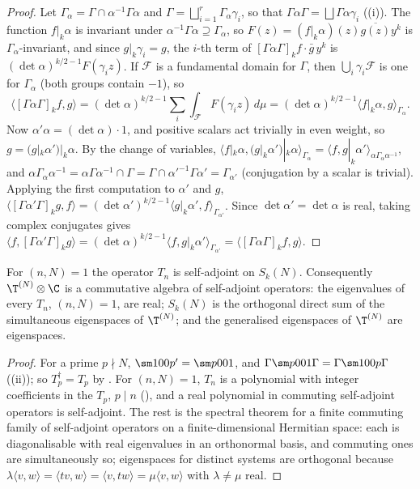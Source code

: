 \begin{proof}
Let $\Gamma_\alpha=\Gamma\cap\alpha^{-1}\Gamma\alpha$ and $\Gamma=\bigsqcup_{i=1}^r\Gamma_\alpha\gamma_i$, so that $\Gamma\alpha\Gamma=\bigsqcup\Gamma\alpha\gamma_i$ ((i)). The function $f|_k\alpha$ is
invariant under $\alpha^{-1}\Gamma\alpha\supseteq\Gamma_\alpha$, so $F(z)=(f|_k\alpha)(z)\overline{g(z)}y^k$ is $\Gamma_\alpha$-invariant, and since $g|_k\gamma_i=g$, the $i$-th term of $[\Gamma\alpha\Gamma]_kf\cdot\bar g\,y^k$ is
$(\det\alpha)^{k/2-1}F(\gamma_iz)$. If $\mathcal F$ is a fundamental domain for $\Gamma$, then $\bigcup_i\gamma_i\mathcal F$ is one for $\Gamma_\alpha$ (both groups contain $-1$), so
\[
\langle[\Gamma\alpha\Gamma]_kf,g\rangle=(\det\alpha)^{k/2-1}\sum_i\int_{\mathcal F}F(\gamma_iz)\,d\mu=(\det\alpha)^{k/2-1}\langle f|_k\alpha,g\rangle_{\Gamma_\alpha}.
\]
Now $\alpha'\alpha=(\det\alpha)\cdot1$, and positive scalars act trivially in even weight, so $g=(g|_k\alpha')|_k\alpha$. By the change of variables,
$\langle f|_k\alpha,(g|_k\alpha')|_k\alpha\rangle_{\Gamma_\alpha}=\langle f,g|_k\alpha'\rangle_{\alpha\Gamma_\alpha\alpha^{-1}}$, and $\alpha\Gamma_\alpha\alpha^{-1}=\alpha\Gamma\alpha^{-1}\cap\Gamma=\Gamma\cap\alpha'^{-1}\Gamma\alpha'=\Gamma_{\alpha'}$ (conjugation by a scalar is
trivial). Applying the first computation to $\alpha'$ and $g$, $\langle[\Gamma\alpha'\Gamma]_kg,f\rangle=(\det\alpha')^{k/2-1}\langle g|_k\alpha',f\rangle_{\Gamma_{\alpha'}}$. Since $\det\alpha'=\det\alpha$ is real, taking complex
conjugates gives $\langle f,[\Gamma\alpha'\Gamma]_kg\rangle=(\det\alpha)^{k/2-1}\langle f,g|_k\alpha'\rangle_{\Gamma_{\alpha'}}=\langle[\Gamma\alpha\Gamma]_kf,g\rangle$.
\end{proof}

\begin{theorem}\label{thm:hecke:self-adjoint}
For $(n,N)=1$ the operator $T_n$ is self-adjoint on $S_k(N)$. Consequently $\T^{(N)}\otimes\C$ is a commutative algebra of self-adjoint operators: the eigenvalues of every $T_n$,
$(n,N)=1$, are real; $S_k(N)$ is the orthogonal direct sum of the simultaneous eigenspaces of $\T^{(N)}$; and the generalised eigenspaces of $\T^{(N)}$ are eigenspaces.
\end{theorem}

\begin{proof}
For a prime $p\nmid N$, $\sm100p'=\sm p001$, and $\Gamma\sm p001\Gamma=\Gamma\sm100p\Gamma$ ((ii)); so $T_p^\dagger=T_p$ by
. For $(n,N)=1$, $T_n$ is a polynomial with integer coefficients in the $T_p$, $p\mid n$ (), and a real polynomial in
commuting self-adjoint operators is self-adjoint. The rest is the spectral theorem for a finite commuting family of self-adjoint operators on a finite-dimensional Hermitian
space: each is diagonalisable with real eigenvalues in an orthonormal basis, and commuting ones are simultaneously so; eigenspaces for distinct systems are orthogonal
because $\lambda\langle v,w\rangle=\langle tv,w\rangle=\langle v,tw\rangle=\mu\langle v,w\rangle$ with $\lambda\ne\mu$ real.
\end{proof}

